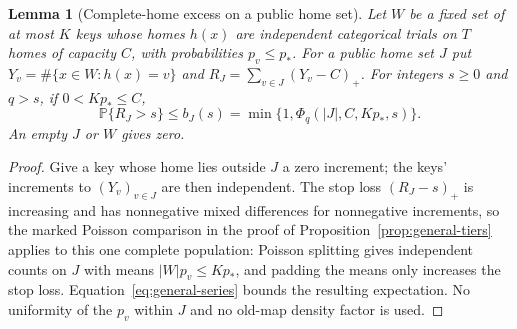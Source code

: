 \documentclass[11pt]{article}
\newtheorem{lemma}[theorem]{Lemma}
\theoremstyle{definition}
\theoremstyle{remark}
\newcommand{\Prb}{\mathbb P}
\begin{document}
\begin{lemma}[Complete-home excess on a public home set]
\label{lem:restricted-excess}
Let $W$ be a fixed set of at most $K$ keys whose homes $h(x)$ are
independent categorical trials on $T$ homes of capacity $C$, with
probabilities $p_v\le p_*$. For a public home set $J$ put
$Y_v=\#\{x\in W:h(x)=v\}$ and $R_J=\sum_{v\in J}(Y_v-C)_+$. For integers
$s\ge0$ and $q>s$, if $0<Kp_*\le C$,
\[
 \Prb\{R_J>s\}\le b_J(s)=\min\{1,\Phi_q(|J|,C,Kp_*,s)\}.
\]
An empty $J$ or $W$ gives zero.
\end{lemma}
\begin{proof}
Give a key whose home lies outside $J$ a zero increment; the keys'
increments to $(Y_v)_{v\in J}$ are then independent. The stop loss
$(R_J-s)_+$ is increasing and has nonnegative mixed differences for
nonnegative increments, so the marked Poisson comparison in the proof of
Proposition~\ref{prop:general-tiers} applies to this one complete
population: Poisson splitting gives independent counts on $J$ with means
$|W|p_v\le Kp_*$, and padding the means only increases the stop loss.
Equation~\eqref{eq:general-series} bounds the resulting expectation. No
uniformity of the $p_v$ within $J$ and no old-map density factor is used.
\end{proof}
\end{document}
